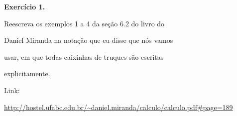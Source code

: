 \documentclass[oneside,12pt]{article}
\begin{document}
\newpage

{\bf Exercício 1.}

Reescreva os exemplos 1 a 4 da seção 6.2 do livro do

Daniel Miranda na notação que eu disse que nós vamos

usar, em que todas caixinhas de truques são escritas

explicitamente.

\msk

Link:

\ssk

{\scriptsize

\url{http://hostel.ufabc.edu.br/~daniel.miranda/calculo/calculo.pdf\#page=189}

}


% 
% 
% 







\end{document}
